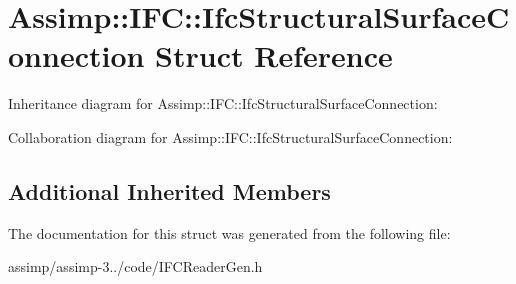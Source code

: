 \hypertarget{struct_assimp_1_1_i_f_c_1_1_ifc_structural_surface_connection}{\section{Assimp\+:\+:I\+F\+C\+:\+:Ifc\+Structural\+Surface\+Connection Struct Reference}
\label{struct_assimp_1_1_i_f_c_1_1_ifc_structural_surface_connection}
}


Inheritance diagram for Assimp\+:\+:I\+F\+C\+:\+:Ifc\+Structural\+Surface\+Connection\+:


Collaboration diagram for Assimp\+:\+:I\+F\+C\+:\+:Ifc\+Structural\+Surface\+Connection\+:
\subsection*{Additional Inherited Members}


The documentation for this struct was generated from the following file\+:\begin{DoxyCompactItemize}
\item 
assimp/assimp-\/3../code/I\+F\+C\+Reader\+Gen.\+h\end{DoxyCompactItemize}
